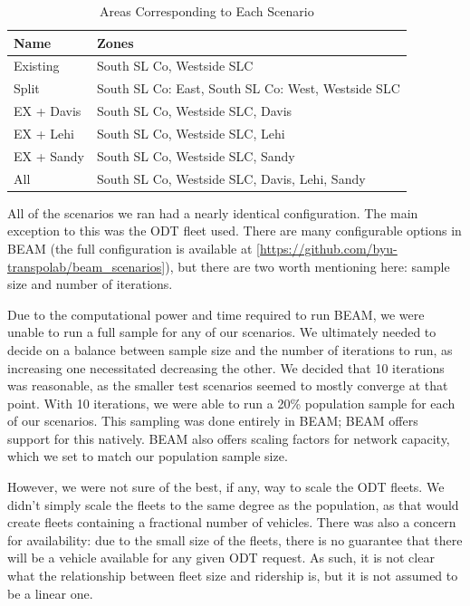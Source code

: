 \documentclass[
]{report}
\begin{document}
\begin{table}

\caption{\label{tab:scenarios-info}Areas Corresponding to Each Scenario}
\centering
\begin{tabular}[t]{ll}
\toprule
Name & Zones\\
\midrule
Existing & South SL Co, Westside SLC\\
Split & South SL Co: East, South SL Co: West, Westside SLC\\
EX + Davis & South SL Co, Westside SLC, Davis\\
EX + Lehi & South SL Co, Westside SLC, Lehi\\
EX + Sandy & South SL Co, Westside SLC, Sandy\\
All & South SL Co, Westside SLC, Davis, Lehi, Sandy\\
\bottomrule
\end{tabular}
\end{table}

All of the scenarios we ran had a nearly identical configuration. The main exception to this was the ODT fleet used. There are many configurable options in BEAM (the full configuration is available at {[}\url{https://github.com/byu-transpolab/beam_scenarios}{]}), but there are two worth mentioning here: sample size and number of iterations.

Due to the computational power and time required to run BEAM, we were unable to run a full sample for any of our scenarios. We ultimately needed to decide on a balance between sample size and the number of iterations to run, as increasing one necessitated decreasing the other. We decided that 10 iterations was reasonable, as the smaller test scenarios seemed to mostly converge at that point. With 10 iterations, we were able to run a 20\% population sample for each of our scenarios. This sampling was done entirely in BEAM; BEAM offers support for this natively. BEAM also offers scaling factors for network capacity, which we set to match our population sample size.

However, we were not sure of the best, if any, way to scale the ODT fleets. We didn't simply scale the fleets to the same degree as the population, as that would create fleets containing a fractional number of vehicles. There was also a concern for availability: due to the small size of the fleets, there is no guarantee that there will be a vehicle available for any given ODT request. As such, it is not clear what the relationship between fleet size and ridership is, but it is not assumed to be a linear one.
\end{document}
